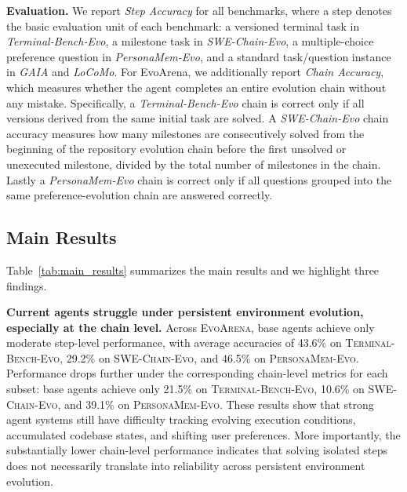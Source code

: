 \documentclass{article}
\begin{document}
\textbf{Evaluation.} \quad
We report \emph{Step Accuracy} for all benchmarks, where a step denotes the basic evaluation unit of each benchmark: a versioned terminal task in \emph{Terminal-Bench-Evo}, a milestone task in \emph{SWE-Chain-Evo}, a multiple-choice preference question in \emph{PersonaMem-Evo}, and a standard task/question instance in \emph{GAIA} and \emph{LoCoMo}. 
For EvoArena, we additionally report \emph{Chain Accuracy}, which measures whether the agent completes an entire evolution chain without any mistake. Specifically, a \emph{Terminal-Bench-Evo} chain is correct only if all versions derived from the same initial task are solved. A \emph{SWE-Chain-Evo} chain accuracy measures how many milestones are consecutively solved from the beginning of the repository evolution chain before the first unsolved or unexecuted milestone, divided by the total number of milestones in the chain. Lastly a \emph{PersonaMem-Evo} chain is correct only if all questions grouped into the same preference-evolution chain are answered correctly.



\subsection{Main Results}
\label{sec:main_results}

Table~\ref{tab:main_results} summarizes the main results and we highlight three findings.


\textbf{Current agents struggle under persistent environment evolution, especially at the chain level.}
Across \textsc{EvoArena}, base agents achieve only moderate step-level performance, with average accuracies of 43.6\% on \textsc{Terminal-Bench-Evo}, 29.2\% on \textsc{SWE-Chain-Evo}, and 46.5\% on \textsc{PersonaMem-Evo}. Performance drops further under the corresponding chain-level metrics for each subset: base agents achieve only 21.5\% on \textsc{Terminal-Bench-Evo}, 10.6\% on \textsc{SWE-Chain-Evo}, and 39.1\% on \textsc{PersonaMem-Evo}. These results show that strong agent systems still have difficulty tracking evolving execution conditions, accumulated codebase states, and shifting user preferences. More importantly, the substantially lower chain-level performance indicates that solving isolated steps does not necessarily translate into reliability across persistent environment evolution.
\end{document}
